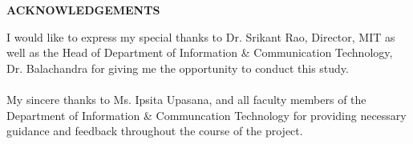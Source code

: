\begin{center}
\large{\textbf{ACKNOWLEDGEMENTS}}\\
\vspace{1cm}
\end{center}
I would like to express my special thanks to Dr. Srikant Rao, Director, MIT as well as the Head of Department of Information \& Communication Technology, Dr. Balachandra for giving me the opportunity to conduct this study.\\\\
My sincere thanks to Ms. Ipsita Upasana, and all faculty members of the Department of Information \& Communcation Technology for providing necessary guidance and feedback throughout the course of the project.


